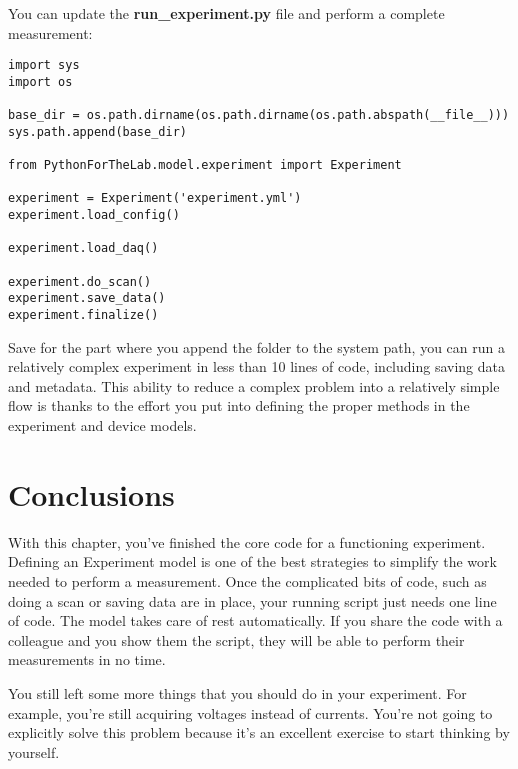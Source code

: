 You can update the \textbf{run\_experiment.py} file and perform a complete measurement:

\begin{verbatim}
import sys
import os

base_dir = os.path.dirname(os.path.dirname(os.path.abspath(__file__)))
sys.path.append(base_dir)

from PythonForTheLab.model.experiment import Experiment

experiment = Experiment('experiment.yml')
experiment.load_config()

experiment.load_daq()

experiment.do_scan()
experiment.save_data()
experiment.finalize()
\end{verbatim}

Save for the part where you append the folder to the system path, you can run a relatively complex experiment in less than 10 lines of code, including saving data and metadata. This ability to reduce a complex problem into a relatively simple flow is thanks to the effort you put into defining the proper methods in the experiment and device models.

\section{Conclusions}\label{sec:experiment-model-conclusions}
With this chapter, you've finished the core code for a functioning experiment. Defining an Experiment model is one of the best strategies to simplify the work needed to perform a measurement. Once the complicated bits of code, such as doing a scan or saving data are in place, your running script just needs one line of code. The model takes care of rest automatically. If you share the code with a colleague and you show them the  script, they will be able to perform their measurements in no time.

You still left some more things that you should do in your experiment. For example, you're still acquiring voltages instead of currents. You're not going to explicitly solve this problem because it's an excellent exercise to start thinking by yourself.


